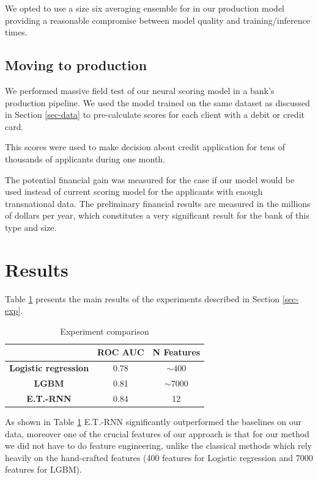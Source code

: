\documentclass[sigconf]{acmart}
\begin{document}
We opted to use a size six averaging ensemble for in our production model providing a reasonable compromise between model quality and training/inference times. 

\subsection{Moving to production}

We performed massive field test of our neural scoring model in a bank's production pipeline. We used the model trained on the same dataset as discussed in Section \ref{sec-data} to pre-calculate scores for each client with a debit or credit card.

This scores were used to make decision about credit application for tens of thousands of applicants during one month.

The potential financial gain was measured for the case if our model would be used instead of current scoring model for the applicants with enough transnational data. The preliminary financial results are measured in the millions of dollars per year, which constitutes a very significant result for the bank of this type and size.

\section{Results}

Table \ref{tab-res} presents the main results of the experiments described in Section \ref{sec-exp}.

\begin{table}[ht]
\caption{Experiment comparison}
\begin{tabular}{ | c | c | c | }
\hline
& \textbf{ROC AUC} & \textbf{N Features} \\
\hline
\textbf{Logistic regression} & 0.78 & $\sim400$ \\
\textbf{LGBM} & 0.81 & $\sim7000$ \\
\textbf{E.T.-RNN} & 0.84 & 12 \\
\hline
\end{tabular}
\label{tab-res}
\end{table}

As shown in Table \ref{tab-res} E.T.-RNN significantly outperformed the baselines on our data, moreover one of the crucial features of our approach is that for our method we did not have to do feature engineering, unlike the classical methods which rely heavily on the hand-crafted features (400 features for Logistic regression and 7000 features for LGBM).
\end{document}
